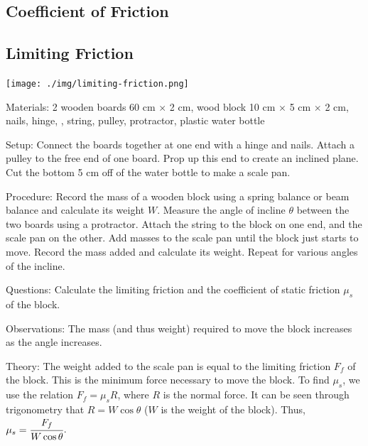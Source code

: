 \begin{multicols}{2}
\columnbreak


\section*{Coefficient of Friction}


\subsection{Limiting Friction}

\begin{center}
\texttt{[image: ./img/limiting-friction.png]}
\end{center}

\begin{description*}
\item[Materials:]{2 wooden boards 60 cm $\times$ 2 cm, wood block 10 cm $\times$ 5 cm $\times$ 2 cm, nails, hinge, , string, pulley, protractor, plastic water bottle}
\item[Setup:]{Connect the boards together at one end with a hinge and nails. Attach a pulley to the free end of one board. Prop up this end to create an inclined plane. Cut the bottom 5 cm off of the water bottle to make a scale pan.}
\item[Procedure:]{Record the mass of a wooden block using a spring balance or beam balance and calculate its weight $W$. Measure the angle of incline $\theta$ between the two boards using a protractor. Attach the string to the block on one end, and the scale pan on the other. Add masses to the scale pan until the block just starts to move. Record the mass added and calculate its weight. Repeat for various angles of the incline.}
\item[Questions:]{Calculate the limiting friction and the coefficient of static friction $\mu_s$ of the block.}
\item[Observations:]{The mass (and thus weight) required to move the block increases as the angle increases.}
\item[Theory:]{The weight added to the scale pan is equal to the limiting friction $F_f$ of the block. This is the minimum force necessary to move the block. To find $\mu_s$, we use the relation $F_f=\mu_s R$, where $R$ is the normal force. It can be seen through trigonometry that $R=W\cos{\theta}$ ($W$ is the weight of the block). Thus, $\mu_s=\cfrac{F_f}{W\cos{\theta}}$.}
\end{description*}


\end{multicols}

